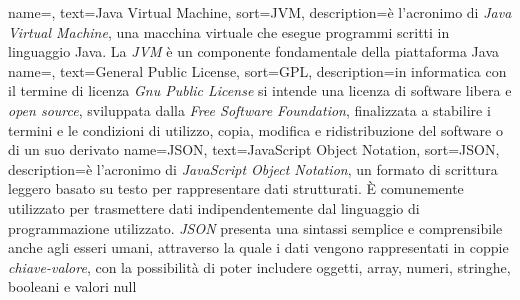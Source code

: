  {
    name=,
    text=Java Virtual Machine,
    sort=JVM,
    description={è l'acronimo di \textit{Java Virtual Machine},
     una macchina virtuale che esegue programmi scritti in linguaggio Java. La \textit{JVM} è un componente fondamentale della piattaforma Java}
}
     {
        name=,
        text=General Public License,
        sort=GPL,
        description={in informatica con il termine di licenza \textit{Gnu Public License} si intende  
        una licenza di software libera e \textit{open source}, sviluppata dalla \textit{Free Software Foundation}, finalizzata a stabilire i termini e le condizioni 
        di utilizzo, copia, modifica e ridistribuzione del software o di un suo derivato}
    }
    {
        name={JSON},
        text=JavaScript Object Notation,
        sort=JSON,
        description={è l'acronimo di \textit{JavaScript Object Notation}, un formato di scrittura leggero basato su testo per rappresentare dati strutturati. 
        È comunemente utilizzato per trasmettere dati indipendentemente dal linguaggio di programmazione utilizzato. \textit{JSON} presenta una sintassi semplice e comprensibile anche agli 
        esseri umani, attraverso la quale i dati vengono rappresentati in coppie \textit{chiave-valore}, con la possibilità di poter includere 
        oggetti, array, numeri, stringhe, booleani e valori null}
    }
